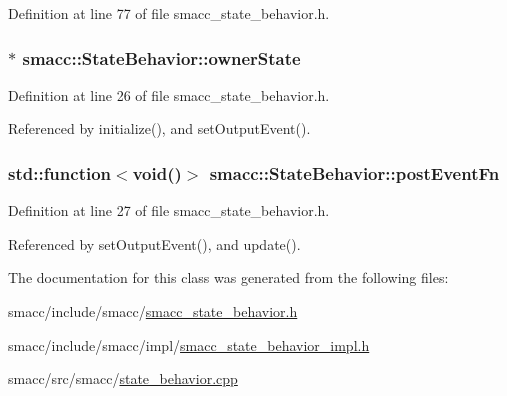 Definition at line 77 of file smacc\+\_\+state\+\_\+behavior.\+h.

\subsubsection[{\texorpdfstring{owner\+State}{ownerState}}]{$\ast$ smacc\+::\+State\+Behavior\+::owner\+State}\hypertarget{classsmacc_1_1StateBehavior_abdc8c883baf520fd01f98e046d045dca}{}\label{classsmacc_1_1StateBehavior_abdc8c883baf520fd01f98e046d045dca}


Definition at line 26 of file smacc\+\_\+state\+\_\+behavior.\+h.



Referenced by initialize(), and set\+Output\+Event().

\subsubsection[{\texorpdfstring{post\+Event\+Fn}{postEventFn}}]{\setlength{\rightskip}{0pt plus 5cm}std\+::function$<$void()$>$ smacc\+::\+State\+Behavior\+::post\+Event\+Fn}\hypertarget{classsmacc_1_1StateBehavior_aa8485f8a68716ca9429ac8e72e057b7c}{}\label{classsmacc_1_1StateBehavior_aa8485f8a68716ca9429ac8e72e057b7c}


Definition at line 27 of file smacc\+\_\+state\+\_\+behavior.\+h.



Referenced by set\+Output\+Event(), and update().



The documentation for this class was generated from the following files\+:\begin{DoxyCompactItemize}
\item 
smacc/include/smacc/\hyperlink{smacc__state__behavior_8h}{smacc\+\_\+state\+\_\+behavior.\+h}\item 
smacc/include/smacc/impl/\hyperlink{smacc__state__behavior__impl_8h}{smacc\+\_\+state\+\_\+behavior\+\_\+impl.\+h}\item 
smacc/src/smacc/\hyperlink{state__behavior_8cpp}{state\+\_\+behavior.\+cpp}\end{DoxyCompactItemize}
